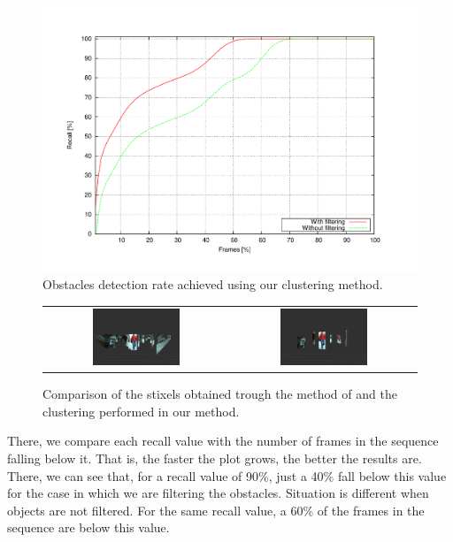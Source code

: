 \begin{figure}[h!]
\centering
\includegraphics[width=\textwidth,height=0.5\textwidth,trim=50 40 80 60,clip]{detectionRate}
\caption{Obstacles detection rate achieved using our clustering method.}\label{fig:cp04_detection_rate}
\end{figure}

\begin{figure}[h!]
\begin{tabular}{cc}
\includegraphics[width=0.49\textwidth]{stixelsDetection}\label{fig:cp04_stixels_detection} &
\includegraphics[width=0.49\textwidth]{obstacleDetection}\label{fig:cp04_obstacle_detection}
\end{tabular}
\caption{Comparison of the stixels obtained trough the method of \cite{benenson2012pedestrian} and the clustering performed in our method.}\label{fig:cp04_clustering_comparison}
\end{figure}

There, we compare each recall value with the number of frames in the sequence falling below it. That is, the faster the plot grows, the better the results are. There, we can see that, for a recall value of 90\%, just a 40\% fall below this value for the case in which we are filtering the obstacles. Situation is different when objects are not filtered. For the same recall value, a 60\% of the frames in the sequence are below this value.

